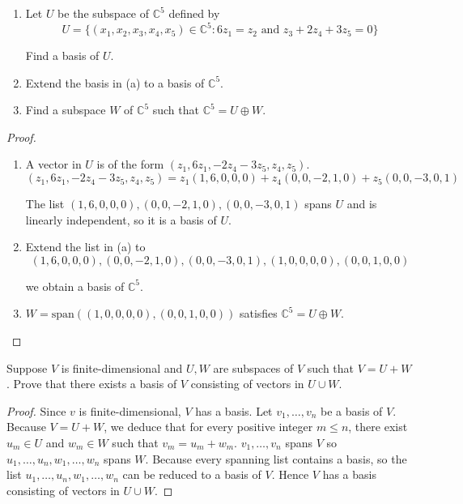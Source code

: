 \begin{exercise}
    \begin{enumerate}[label={(\alph*)}]
        \item Let $U$ be the subspace of $\mathbb{C}^{5}$ defined by
              \[
                  U = \{ (x_{1}, x_{2}, x_{3}, x_{4}, x_{5})\in\mathbb{C}^{5}: 6z_{1} = z_{2} \text{ and } z_{3} + 2z_{4} + 3z_{5} = 0 \}
              \]

              Find a basis of $U$.
        \item Extend the basis in (a) to a basis of $\mathbb{C}^{5}$.
        \item Find a subspace $W$ of $\mathbb{C}^{5}$ such that $\mathbb{C}^{5} = U\oplus W$.
    \end{enumerate}
\end{exercise}

\begin{proof}
    \begin{enumerate}[label={(\alph*)}]
        \item A vector in $U$ is of the form $(z_{1}, 6z_{1}, -2z_{4} - 3z_{5}, z_{4}, z_{5})$.
              \[
                  (z_{1}, 6z_{1}, -2z_{4} - 3z_{5}, z_{4}, z_{5}) = z_{1}(1, 6, 0, 0, 0) + z_{4}(0, 0, -2, 1, 0) + z_{5}(0, 0, -3, 0, 1)
              \]

              The list $(1, 6, 0, 0, 0), (0, 0, -2, 1, 0), (0, 0, -3, 0, 1)$ spans $U$ and is linearly independent, so it is a basis of $U$.
        \item Extend the list in (a) to
              \[
                  (1, 6, 0, 0, 0), (0, 0, -2, 1, 0), (0, 0, -3, 0, 1), (1, 0, 0, 0, 0), (0, 0, 1, 0, 0)
              \]

              we obtain a basis of $\mathbb{C}^{5}$.
        \item  $W = \text{span}((1, 0, 0, 0, 0), (0, 0, 1, 0, 0))$ satisfies $\mathbb{C}^{5} = U\oplus W$.
    \end{enumerate}
\end{proof}

\begin{exercise}
    Suppose $V$ is finite-dimensional and $U, W$ are subspaces of $V$ such that $V = U + W$. Prove that there exists a basis of $V$ consisting of vectors in $U \cup W$.
\end{exercise}

\begin{proof}
    Since $v$ is finite-dimensional, $V$ has a basis. Let $v_{1}, \ldots, v_{n}$ be a basis of $V$. Because $V = U + W$, we deduce that for every positive integer $m\leq n$, there exist $u_{m}\in U$ and $w_{m}\in W$ such that $v_{m} = u_{m} + w_{m}$. $v_{1}, \ldots, v_{n}$ spans $V$ so $u_{1}, \ldots, u_{n}, w_{1}, \ldots, w_{n}$ spans $W$. Because every spanning list contains a basis, so the list $u_{1}, \ldots, u_{n}, w_{1}, \ldots, w_{n}$ can be reduced to a basis of $V$. Hence $V$ has a basis consisting of vectors in $U\cup W$.
\end{proof}

